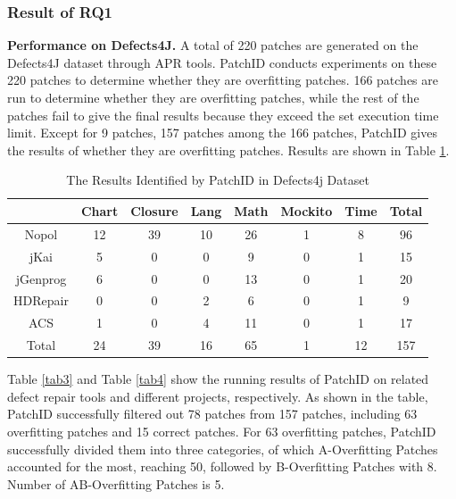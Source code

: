\documentclass[sn-basic]{sn-jnl}
\theoremstyle{thmstyleone}
\theoremstyle{thmstyletwo}
\theoremstyle{thmstylethree}
\begin{document}
\subsubsection{Result of RQ1}
\textbf{Performance on Defects4J.} A total of 220 patches are generated on the Defects4J dataset through APR tools. PatchID conducts experiments on these 220 patches to determine whether they are overfitting patches. 166 patches are run to determine whether they are overfitting patches, while the rest of the patches fail to give the final results because they exceed the set execution time limit. Except for 9 patches, 157 patches among the 166 patches, PatchID gives the results of whether they are overfitting patches. Results are shown in Table \ref{tab2}.
\begin{table}[ht]
	\begin{center}
		\begin{minipage}{\textwidth}
			\caption{The Results Identified by PatchID in Defects4j Dataset}\label{tab2}%
		
			\begin{tabular}{cccccccc}
				\toprule
				\diagbox{Project}{Tools} &Chart	&Closure	&Lang	&Math &Mockito &Time &Total \\ \hline
				Nopol  &12 &39	&10  &26 &1 &8 &96\\ 
				jKai  &5 &0	&0  &9 &0 &1 &15\\ 
				jGenprog  &6 &0	&0  &13 &0 &1 &20\\ 
				HDRepair  &0 &0	&2 &6  &0 &1 &9\\ 
				ACS  &1 &0	&4  &11 &0 &1 &17\\ 
				Total  &24 &39	&16  &65 &1 &12 &157 \\
				\bottomrule
			\end{tabular}
		
		\end{minipage}
	\end{center}
\end{table}

Table \ref{tab3} and Table \ref{tab4} show the running results of PatchID on related defect repair tools and different projects, respectively. As shown in the table, PatchID successfully filtered out 78 patches from 157 patches, including 63 overfitting patches and 15 correct patches. For 63 overfitting patches, PatchID successfully divided them into three categories, of which A-Overfitting Patches accounted for the most, reaching 50, followed by B-Overfitting Patches with 8. Number of AB-Overfitting Patches is 5.
\end{document}
